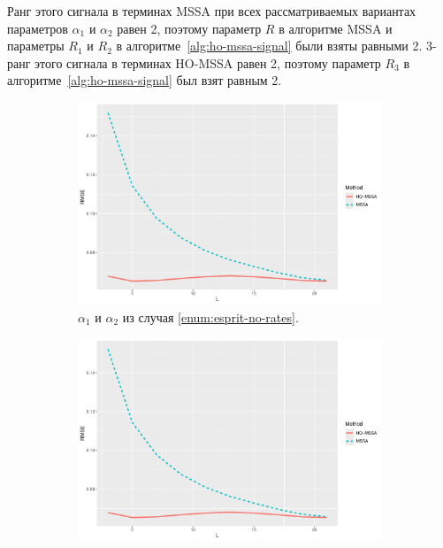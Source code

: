 \documentclass[specialist,
  substylefile=spbu_report.rtx,
subf,href,colorlinks=true, 12pt]{disser}
\theoremstyle{plain}
\theoremstyle{definition}
\theoremstyle{remark}
\begin{document}
Ранг этого сигнала в терминах MSSA при всех рассматриваемых
вариантах параметров $\alpha_1$ и $\alpha_2$ равен 2, поэтому
параметр $R$ в алгоритме MSSA
и параметры $R_1$ и $R_2$ в алгоритме~\ref{alg:ho-mssa-signal} были
взяты равными 2.
3-ранг этого сигнала в терминах HO-MSSA равен 2, поэтому параметр
$R_3$ в алгоритме~\ref{alg:ho-mssa-signal} был взят равным 2.

\begin{figure}
  \centering
  \begin{subfigure}{0.49\linewidth}
    \includegraphics[width=\linewidth,
    height=0.167\textheight]{rec_L_rmse_no_rates.pdf}
    \caption{$\alpha_1$ и $\alpha_2$ из случая \ref{enum:esprit-no-rates}.}
    \label{fig:L_rmse_no_rates}
  \end{subfigure}
  \begin{subfigure}{0.49\linewidth}
    \includegraphics[width=\linewidth,
    height=0.167\textheight]{rec_L_rmse_small_eq_rates.pdf}

\end{subfigure}
\end{figure}
\end{document}
